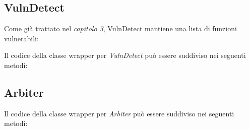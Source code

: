 \documentclass[12pt, a4paper, oneside]{report}
\begin{document}
\begin{appendices}
        \subsection{VulnDetect}
        Come già trattato nel \textit{capitolo 3}, VulnDetect mantiene una lista di funzioni vulnerabili:
        
        Il codice della classe wrapper per \textit{VulnDetect} può essere suddiviso nei seguenti metodi:
        
        
        \newpage
        
        \newpage
        

        \subsection{Arbiter}
        Il codice della classe wrapper per \textit{Arbiter} può essere suddiviso nei seguenti metodi:
        
        
        
        
    \end{appendices}
\end{document}
